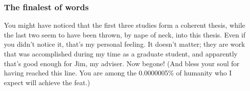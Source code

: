 \subsubsection{The finalest of words }

You might have noticed that the first three studies form a coherent thesis,
while the last two seem to have been thrown, by nape of neck, into this
thesis. Even if you didn't notice it, that's my personal feeling. It doesn't
matter; they are work that was accomplished during my time as a graduate
student, and apparently that's good enough for Jim, my adviser. Now begone!
(And bless your soul for having reached this line. You are among the 0.0000005\%
of humanity who I expect will achieve the feat.)



